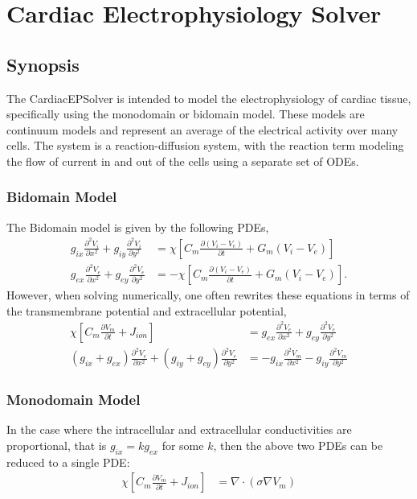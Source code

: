 \section{Cardiac Electrophysiology Solver}

\subsection{Synopsis}

The CardiacEPSolver is intended to model the electrophysiology of cardiac
tissue, specifically using the monodomain or bidomain model. These models are
continuum models and represent an average of the electrical activity over many
cells. The system is a reaction-diffusion system, with the reaction term
modeling the flow of current in and out of the cells using a separate set of
ODEs.

\subsubsection{Bidomain Model}
The Bidomain model is given by the following PDEs,
\begin{align*}
g_{ix}\frac{\partial^2 V_i}{\partial x^2} + g_{iy}\frac{\partial^2 V_i}{\partial y^2} &=  \chi \left[ C_m \frac{\partial(V_i-V_e)}{\partial t} + G_m(V_i-V_e) \right] \\
g_{ex}\frac{\partial^2 V_e}{\partial x^2} + g_{ey}\frac{\partial^2 V_e}{\partial y^2} &= -\chi\left[ C_m \frac{\partial(V_i-V_e)}{\partial t} + G_m(V_i-V_e) \right].
\end{align*}
However, when solving numerically, one often rewrites these equations in terms
of the transmembrane potential and extracellular potential,
\begin{align*}
\chi \left[ C_m \frac{\partial V_m}{\partial t} + J_{ion} \right] &= g_{ex}\frac{\partial^2 V_e}{\partial x^2} + g_{ey}\frac{\partial^2 V_e}{\partial y^2}\\
(g_{ix} + g_{ex})\frac{\partial^2 V_e}{\partial x^2} + (g_{iy} + g_{ey})\frac{\partial^2 V_e}{\partial y^2} 
  &= -g_{ix} \frac{\partial^2 V_m}{\partial x^2} - g_{iy} \frac{\partial^2 V_m}{\partial y^2}
\end{align*}

\subsubsection{Monodomain Model}
In the case where the intracellular and extracellular conductivities are
proportional, that is $g_{ix} = kg_{ex}$ for some $k$,
then the above two PDEs can be reduced to a single PDE:
\begin{align*}
\chi\left[ C_m \frac{\partial V_m}{\partial t} + J_{ion} \right] &= \nabla \cdot (\sigma \nabla V_m)
\end{align*}

